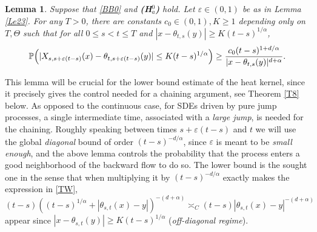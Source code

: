 \documentclass[11pt]{article}
\numberwithin{equation}{section}\providecommand{\asymp}{\mathrel{\sim}}
\theoremstyle{plain}
\newtheorem{lemma}[theorem]{Lemma}
\theoremstyle{definition}
\let\eps\varepsilon
\newcommand\mP{\mathbb{P}}
\newcommand\1{{\mathbf{1}}}
\begin{document}
\begin{lemma}\label{Le26}
Suppose that \eqref{BB0} and {\bf (H$^0_a$)} hold. Let $\eps\in(0,1)$ be as in Lemma \ref{Le23}. For any $T>0$,
there are constants $c_0\in(0,1),K\geq 1$ depending only on $T,\Theta$
such that for all $0\leq s<t\leq T$ and $|x-\theta_{t,s}(y)|\geq K(t-s)^{1/\alpha}$,
\[
\mP\Bigl(|X_{s,s+\eps(t-s)}(x)-\theta_{t,s+\eps(t-s)}(y)|\leq K(t-s)^{1/\alpha}\Bigr)\geq \frac{c_0(t-s)^{1+d/\alpha}}{|x-\theta_{t,s}(y)|^{d+\alpha}}.
\]
\end{lemma}
This lemma will be crucial for the lower bound estimate of the heat kernel, since it precisely gives the control needed for a chaining argument, see Theorem \ref{T8} below. As opposed to the continuous case, for SDEs driven by pure jump processes, a single intermediate time, associated with a \textit{large jump}, is needed for the chaining. Roughly speaking between times $s+\eps(t-s)$ and $t$ we will use the global \textit{diagonal} bound of order $(t-s)^{-d/\alpha} $, since $ \eps$ is meant to be \textit{small enough}, and the above lemma controls the probability that the process enters a good neighborhood of the backward flow to do so. The lower bound is the sought one in the sense that when
multiplying it by $(t-s)^{-d/\alpha}$ exactly makes the expression in \eqref{TW},
$ (t-s)((t-s)^{1/\alpha}+|\theta_{s,t}(x)-y|)^{-(d+\alpha)}\asymp_C (t-s)|\theta_{s,t}(x)-y|^{-(d+\alpha)}$ appear since $|x-\theta_{s,t}(y)|\ge K(t-s)^{1/\alpha} $ (\textit{off-diagonal regime}).
\end{document}
